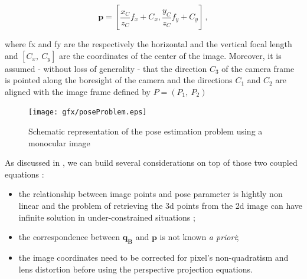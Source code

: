\begin{equation}
  \mathbf{p} = \left[ \frac{x_C}{z_C} f_x + C_x , \frac{y_C}{z_C} f_y + C_y \right] \,,
  \label{eq:p}
\end{equation}

where \gls{fx} and \gls{fy} are the respectively the horizontal and the vertical focal length and $ \left[C_x, \ C_y \right]$ are the coordinates of the center of the image. Moreover, it is assumed - without loss of generality - that the direction $\mathit{C_3}$ of the camera frame is pointed along the boresight of the camera and the directions $\mathit{C_1}$ and $\mathit{C_2}$ are aligned with the image frame defined by $P = \left( \mathit{P_1}, \ \mathit{P_2} \right)$

\begin{figure}[htbp]
  \centering
  \texttt{[image: gfx/poseProblem.eps]}
  \caption{Schematic representation of the pose estimation problem using a monocular image \cite{Sharma2018}}
  \label{fig:theposeproblem}
\end{figure}

As discussed in \cite{D2014}, we can build several considerations on top of those two coupled equations :

\begin{itemize}
  \item the relationship between image points and pose parameter is hightly non linear and the problem of retrieving the \acrshort{3d} points from the \acrshort{2d} image can have infinite solution in under-constrained situations \cite{10.1145/358669.358692};
  \item the correspondence between $\mathbf{q_B}$ and $\mathbf{p}$ is not known \textit{a priori};
  \item the image coordinates need to be corrected for pixel's non-quadratism and lens distortion before using the perspective projection equations.
\end{itemize}

